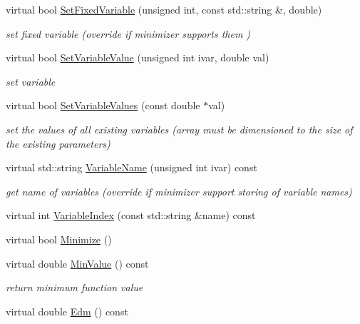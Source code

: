 \begin{DoxyCompactItemize}
virtual bool \mbox{\hyperlink{classROOT_1_1Minuit2_1_1Minuit2Minimizer_af42341b80ebb02d8c0882beaa781e7bd}{Set\+Fixed\+Variable}} (unsigned int, const std\+::string \&, double)
\begin{DoxyCompactList}\small\item\em set fixed variable (override if minimizer supports them ) \end{DoxyCompactList}\item 
virtual bool \mbox{\hyperlink{classROOT_1_1Minuit2_1_1Minuit2Minimizer_a474e05b30c1227e9cc39fb597027f426}{Set\+Variable\+Value}} (unsigned int ivar, double val)
\begin{DoxyCompactList}\small\item\em set variable \end{DoxyCompactList}\item 
virtual bool \mbox{\hyperlink{classROOT_1_1Minuit2_1_1Minuit2Minimizer_a9511e9711f3d1505556af30046c87d03}{Set\+Variable\+Values}} (const double $\ast$val)
\begin{DoxyCompactList}\small\item\em set the values of all existing variables (array must be dimensioned to the size of the existing parameters) \end{DoxyCompactList}\item 
virtual std\+::string \mbox{\hyperlink{classROOT_1_1Minuit2_1_1Minuit2Minimizer_a8f5a6dc65fdfeb0351039d80f7c94968}{Variable\+Name}} (unsigned int ivar) const
\begin{DoxyCompactList}\small\item\em get name of variables (override if minimizer support storing of variable names) \end{DoxyCompactList}\item 
virtual int \mbox{\hyperlink{classROOT_1_1Minuit2_1_1Minuit2Minimizer_a93839e851d16fff50898af2159d8863d}{Variable\+Index}} (const std\+::string \&name) const
\item 
virtual bool \mbox{\hyperlink{classROOT_1_1Minuit2_1_1Minuit2Minimizer_af5d2da195d2b1a7eac6d9b8859eec2b9}{Minimize}} ()
\item 
virtual double \mbox{\hyperlink{classROOT_1_1Minuit2_1_1Minuit2Minimizer_a4a1c7fc174527aefab3d8c87bf8c0672}{Min\+Value}} () const
\begin{DoxyCompactList}\small\item\em return minimum function value \end{DoxyCompactList}\item 
virtual double \mbox{\hyperlink{classROOT_1_1Minuit2_1_1Minuit2Minimizer_ab9c1bfaaaf4c12acd1fd96ece3509269}{Edm}} () const

\end{DoxyCompactItemize}
